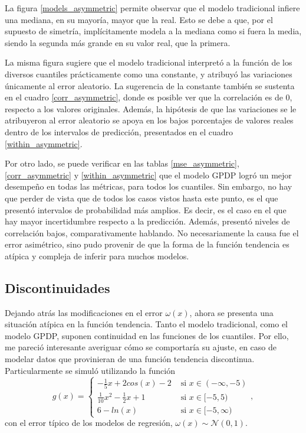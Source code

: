 La figura \ref{models_asymmetric} permite observar que el modelo tradicional infiere una mediana, en su mayor\'ia, mayor que la real. Esto se debe a que, por el supuesto de simetr\'ia, impl\'icitamente modela a la mediana como si fuera la media, siendo la segunda m\'as grande en su valor real, que la primera. 

La misma figura sugiere que el modelo tradicional interpret\'o a la funci\'on de los diversos cuantiles pr\'acticamente como una constante, y atribuy\'o las variaciones \'unicamente al error aleatorio. La sugerencia de la constante tambi\'en se sustenta en el cuadro \ref{corr_asymmetric}, donde es posible ver que la correlaci\'on es de 0, respecto a los valores originales. Adem\'as, la hip\'otesis de que las variaciones se le atribuyeron al error aleatorio se apoya en los bajos porcentajes de valores reales dentro de los intervalos de predicci\'on, presentados en el cuadro \ref{within_asymmetric}.

Por otro lado, se puede verificar en las tablas \ref{mse_asymmetric}, \ref{corr_asymmetric} y \ref{within_asymmetric} que el modelo GPDP logr\'o un mejor desempeño en todas las m\'etricas, para todos los cuantiles. Sin embargo, no hay que perder de vista que de todos los casos vistos hasta este punto, es el que present\'o intervalos de probabilidad m\'as amplios. Es decir, es el caso en el que hay mayor incertidumbre respecto a la predicci\'on. Adem\'as, present\'o niveles de correlaci\'on bajos, comparativamente hablando. No necesariamente la causa fue el error asim\'etrico, sino pudo provenir de que la forma de la funci\'on tendencia es at\'ipica y compleja de inferir para muchos modelos.

\subsection{Discontinuidades}

Dejando atr\'as las modificaciones en el error $\omega(x)$, ahora se presenta una situaci\'on at\'ipica en la funci\'on tendencia. Tanto el modelo tradicional, como el modelo GPDP, suponen continuidad en las funciones de los cuantiles. Por ello, me pareci\'o interesante averiguar c\'omo se comportar\'ia su ajuste, en caso de modelar datos que provinieran de una funci\'on tendencia discontinua. Particularmente se simul\'o utilizando la funci\'on
\begin{equation*}
g(x) = 
\begin{cases}
   - \frac{1}{5} x + 2cos(x) - 2 &\text{ si } x \in (-\infty, -5) \\
   \frac{1}{10} x^2 - \frac{1}{2}x + 1 &\text{ si } x \in [-5, 5) \\
   6 - ln(x) &\text{ si } x \in [-5, \infty)
\end{cases},
\end{equation*}
con el error t\'ipico de los modelos de regresi\'on, $\omega(x) \sim \mathcal{N}(0,1)$.

